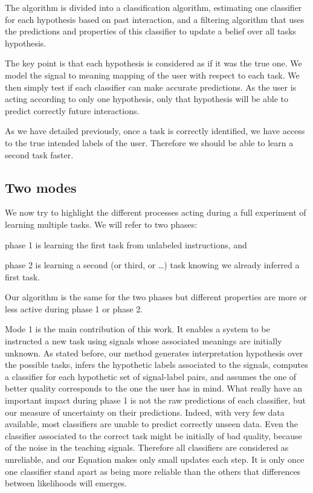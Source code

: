 The algorithm is divided into a classification algorithm, estimating one classifier for each hypothesis based on past interaction, and a filtering algorithm that uses the predictions and properties of this classifier to update a belief over all tasks hypothesis.

The key point is that each hypothesis is considered as if it was the true one. We model the signal to meaning mapping of the user with respect to each task. We then simply test if each classifier can make accurate predictions. As the user is acting according to only one hypothesis, only that hypothesis will be able to predict correctly future interactions.

As we have detailed previously, once a task is correctly identified, we have access to the true intended labels of the user. Therefore we should be able to learn a second task faster.

\subsection{Two modes}

We now try to highlight the different processes acting during a full experiment of learning multiple tasks. We will refer to two phases: \begin{inparaenum}[a)] \item phase 1 is learning the first task from unlabeled instructions, and \item phase 2 is learning a second (or third, or \ldots) task knowing we already inferred a first task. \end{inparaenum} Our algorithm is the same for the two phases but different properties are more or less active during phase 1 or phase 2.

Mode 1 is the main contribution of this work. It enables a system to be instructed a new task using signals whose associated meanings are initially unknown. As stated before, our method generates interpretation hypothesis over the possible tasks, infers the hypothetic labels associated to the signals, computes a classifier for each hypothetic set of signal-label pairs, and assumes the one of better quality corresponds to the one the user has in mind. What really have an important impact during phase 1 is not the raw predictions of each classifier, but our measure of uncertainty on their predictions. Indeed, with very few data available, most classifiers are unable to predict correctly unseen data. Even the classifier associated to the correct task might be initially of bad quality, because of the noise in the teaching signals. Therefore all classifiers are considered as unreliable, and our Equation makes only small updates each step. It is only once one classifier stand apart as being more reliable than the others that differences between likelihoods will emerges.

